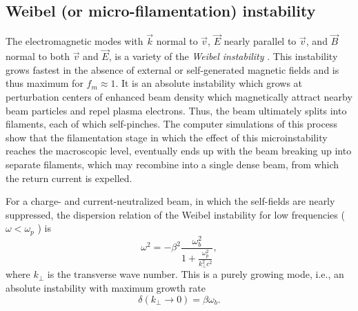 \documentclass [12pt,a4paper,     ]{report} %
\begin{document}
\subsection{Weibel (or micro-filamentation) instability}

	The electromagnetic modes with $\vec{k}$ normal to  $\vec{v}$, $\vec{E}$ nearly parallel to $\vec{v}$, and $\vec{B}$ normal to both $\vec{v}$ and $\vec{E}$, is a variety of the \emph{Weibel instability} \cite{WEIBE1959-}.  This instability grows fastest in the absence of external or self-generated magnetic fields and is thus maximum for $f_m \approx 1$.  It is an absolute instability which grows at perturbation centers of enhanced beam density which magnetically attract nearby beam particles and repel plasma electrons.  Thus, the beam ultimately splits into filaments, each of which self-pinches.  The computer simulations of this process \cite{LEE--1973A} show that the filamentation stage in which the effect of this microinstability reaches the macroscopic level, eventually ends up with the beam breaking up into separate filaments, which may recombine into a single dense beam, from which the return current is expelled.

	For a charge- and current-neutralized beam, in which the self-fields are nearly suppressed, the dispersion relation of the Weibel instability for low frequencies ($\omega < \omega_p$ ) is \cite{LEE--1973A}
%
\begin{equation}\label{mic:13} %
       \omega^2 = -\beta^2 \frac{\omega_b^2}
                           { 1+\frac{\omega_p^2}{k_{\perp}^2 c^2} },
\end{equation}
%
where $k_{\perp}$ is the transverse wave number.  This is a purely growing mode, i.e., an absolute instability with maximum growth rate
%
\begin{equation}\label{mic:14} %
         \delta (k_{\perp} \rightarrow 0) = \beta\omega_b.
\end{equation}
%
\end{document}
